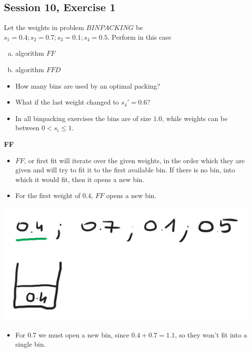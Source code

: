 \subsection {Session 10, Exercise 1}


Let the weights in problem $BINPACKING$ be $s_1 = 0.4; s_2 = 0.7; s_3 = 0.1; s_4 = 0.5$. Perform in this case

\begin{enumerate}[a)]
    \item algorithm $FF$
    \item algorithm $FFD$
\end{enumerate}

\begin{itemize}
    \item How many bins are used by an optimal packing?
    \item What if the last weight changed to $s_4' = 0.6$?
\end{itemize}


\begin{itemize}
    \item In all binpacking exercises the bins are of size $1.0$, while weights can be between $0<s_i\leq{}1$.
\end{itemize}

\textbf{FF}

\begin{itemize}
    \item $FF$, or first fit will iterate over the given weights, in the order which they are given and will try to fit it to the first available bin. If there is no bin, into which it would fit, then it opens a new bin.
    \item For the first weight of $0.4$, $FF$ opens a new bin.
\end{itemize}

\begin{center}
    \includegraphics[width=0.5\linewidth]{10/01/ff_01.png}
\end{center}

\begin{itemize}
    \item For $0.7$ we must open a new bin, since $0.4+0.7=1.1$, so they won't fit into a single bin.
\end{itemize}

